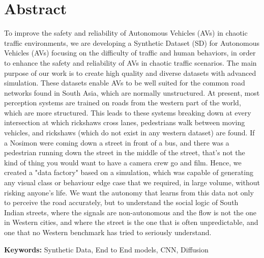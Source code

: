 \section*{Abstract}
To improve the safety and reliability of Autonomous Vehicles (AVs) in chaotic traffic environments, we are developing a Synthetic Dataset (SD) for Autonomous Vehicles (AVs) focusing on the difficulty of traffic and human behaviors, in order to enhance the safety and reliability of AVs in chaotic traffic scenarios. The main purpose of our work is to create high quality and diverse datasets with advanced simulation. These datasets enable AVs to be well suited for the common road networks found in South Asia, which are normally unstructured. At present, most perception systems are trained on roads from the western part of the world, which are more structured. This leads to these systems breaking down at every intersection at which rickshaws cross lanes, pedestrians walk between moving vehicles, and rickshaws (which do not exist in any western dataset) are found. If a Nosimon were coming down a street in front of a bus, and there was a pedestrian running down the street in the middle of the street, that's not the kind of thing you would want to have a camera crew go and film. Hence, we created a "data factory" based on a simulation, which was capable of generating any visual class or behaviour edge case that we required, in large volume, without risking anyone's life. We want the autonomy that learns from this data not only to perceive the road accurately, but to understand the social logic of South Indian streets, where the signals are non-autonomous and the flow is not the one in Western cities, and where the street is the one that is often unpredictable, and one that no Western benchmark has tried to seriously understand.

\vspace{1cm}
\textbf{Keywords:} Synthetic Data, End to End models, CNN, Diffusion
\pagebreak
